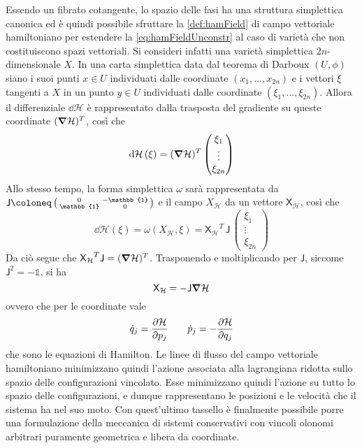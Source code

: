 Essendo un fibrato cotangente, lo spazio delle fasi ha una struttura simplettica canonica ed è quindi possibile sfruttare la \autoref{def:hamField} di campo vettoriale hamiltoniano per estendere la \autoref{eq:hamFieldUnconstr} al caso di varietà che non costituiscono spazi vettoriali. Si consideri infatti una varietà simplettica $2n$-dimensionale $X$. In una carta simplettica data dal teorema di Darboux $(U,\phi)$ siano i suoi punti $x \in U$ individuati dalle coordinate $(x_1, \ldots, x_{2n})$ e i vettori $\xi$ tangenti a $X$ in un punto $y \in U$ individuati dalle coordinate $(\xi_1, \ldots, \xi_{2n})$. Allora il differenziale $\dd{\mathcal{H}}$ è rappresentato dalla trasposta del gradiente su queste coordinate $(\grad{\mathcal{H}})^T$, così che \begin{equation}
\dd{\mathcal{H}}(\xi) = (\grad{\mathcal{H}})^T \begin{pmatrix} \xi_1\\ \vdots\\ \xi_{2n} \end{pmatrix}
\end{equation} 
Allo stesso tempo, la forma simplettica $\omega$ sarà rappresentata da $\mathsf{J} \defeq \left( \begin{smallmatrix}
  0 & -\mathbb{1} \\ \mathbb{1} & 0
\end{smallmatrix}  \right) $ e il campo $X_{\mathcal{H}}$ da un vettore $\mathsf{X_{\mathcal{H}}}$, così che
\begin{equation}
\dd{\mathcal{H}}(\xi) = \omega(X_{\mathcal{H}}, \xi) = \mathsf{X_{\mathcal{H}}}^T\, \mathsf{J}\, \begin{pmatrix} \xi_1\\ \vdots\\ \xi_{2n} \end{pmatrix}
\end{equation} 
Da ciò segue che $\mathsf{X_{\mathcal{H}}}^T \mathsf{J} = (\grad{\mathcal{H}})^T$. Trasponendo e moltiplicando per $\mathsf{J}$, siccome $\mathsf{J}^2 =- \mathbb{1}$, si ha
\begin{equation}
\mathsf{X}_{\mathcal{H}} = -\mathsf{J} \grad{\mathcal{H}} 
\end{equation}
ovvero che per le coordinate vale \begin{equation}
\dot{q}_j = \pdv{\mathcal{H}}{p_j} \qquad \dot{p}_j = - \pdv{\mathcal{H}}{q_j}
\end{equation}
che sono le equazioni di Hamilton. Le linee di flusso del campo vettoriale hamiltoniano minimizzano quindi l'azione associata alla lagrangiana ridotta sullo spazio delle configurazioni vincolato. Esse minimizzano quindi l'azione su tutto lo spazio delle configurazioni, e dunque rappresentano le posizioni e le velocità che il sistema ha nel suo moto. Con quest'ultimo tassello è finalmente possibile porre una formulazione della meccanica di sistemi conservativi con vincoli olonomi arbitrari puramente geometrica e libera da coordinate.

